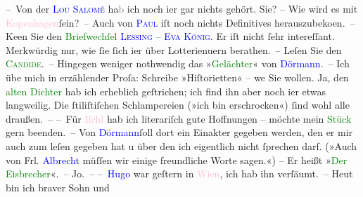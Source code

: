            \pstart
           – Von der \textcolor{blue}{\textsc{Lou Salomé}}{}\ledrightnote{\textcolor{blue}{Lou Andreas-Salomé}} ha\textcolor{gray}{b} ich {\pb}noch i{\geminationm}er gar nichts gehört. Sie? – Wie wird es mit \textcolor{pink}{Kopenhagen}{}\ledrightnote{\textcolor{pink}{Kopenhagen}}{ }ſein? – Auch von \textcolor{blue}{\textsc{Paul}}{}\ledrightnote{\textcolor{blue}{Paul Goldmann}} iſt noch nichts Definitives
                  herauszubeko{\geminationm}en. – Ke{\geminationn}en Sie den \textcolor{green}{Briefwechſel \textsc{\textcolor{blue}{Lessing}{}\ledrightnote{\textcolor{blue}{Gotthold Ephraim Lessing}} – \textcolor{blue}{Eva König}{}\ledrightnote{\textcolor{blue}{Eva König}}}}{}. Er iſt nicht ſehr intereſſant. Merkwürdig nur, wie ſie ſich i{\geminationm}er über Lotterienu{\geminationm}ern {\pb}berathen. – Leſen Sie den \textcolor{green}{\textsc{Candide}}{}\ledrightnote{\textcolor{green}{Candide oder der Optimismus}}. – Hingegen weniger
               nothwendig das »\textcolor{green}{Gelächter}{}\ledrightnote{\textcolor{green}{Gelächter}}« von \textcolor{blue}{Dörmann}{}\ledrightnote{\textcolor{blue}{Felix Dörmann}}. – Ich übe mich in erzählender Proſa: Schreibe
               »Hiſtorietten« – we{\geminationn}
               Sie wollen. Ja, den \textcolor{green}{alten Dichter}{}\ledrightnote{\textcolor{green}{Später Ruhm}} hab ich erheblich geſtrichen; ich find
               ihn aber noch i{\geminationm}er {\pb}etwas langweilig. Die ſtiliſtiſchen Schlampereien (»ich bin erschrocken«) ſind wohl
               alle draußen. –\pend
           \pstart
           – Für \textcolor{pink}{Iſchl}{}\ledrightnote{\textcolor{pink}{Bad Ischl}} hab ich literariſch gute Hoffnungen –
               möchte mein \textcolor{green}{Stück}{} gern
               beenden. – Von \textcolor{blue}{Dörmann}{}\ledrightnote{\textcolor{blue}{Felix Dörmann}}{ }ſoll dort ein Einakter
               gegeben werden, den er mir auch zum leſen gegeben hat u über den ich {\pb}eigentlich nicht ſprechen darf. (»Auch von Frl.
                  \textcolor{blue}{Albrecht}{}\ledrightnote{\textcolor{blue}{Albrecht}} müſſen wir einige freundliche Worte
               sagen.«) – Er heißt »\textcolor{green}{Der Eisbrecher}{}\ledrightnote{\textcolor{green}{Der Eisbrecher}}«. –
               Jo. –\pend
           \pstart
           – \textcolor{blue}{Hugo}{}\ledrightnote{\textcolor{blue}{Hugo von Hofmannsthal}} war geſtern in \textcolor{pink}{Wien}{}\ledrightnote{\textcolor{pink}{Wien}}, ich hab ihn verſäumt. – Heut bin ich braver Sohn und
